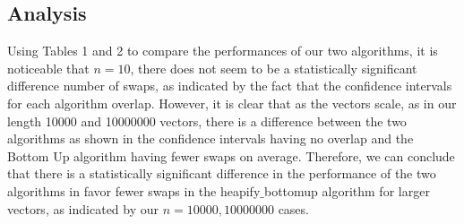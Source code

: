 \documentclass[11pt]{article}
\begin{document}
\subsection*{Analysis}
Using Tables 1 and 2 to compare the performances of our two algorithms, it is noticeable that $n = 10$, there does not seem
to be a statistically significant difference number of swaps, as indicated by the fact that the confidence intervals for each algorithm overlap. However,
it is clear that as the vectors scale, as in our length 10000 and 10000000 vectors, there is a difference between the two algorithms as shown in the confidence intervals having no overlap and the Bottom Up algorithm having fewer swaps on average. Therefore, we can conclude that there is a statistically significant difference 
in the performance of the two algorithms in favor fewer swaps in the heapify$\_$bottomup algorithm for larger vectors, as indicated by our $n = 10000, 10000000$ cases.
\end{document}

